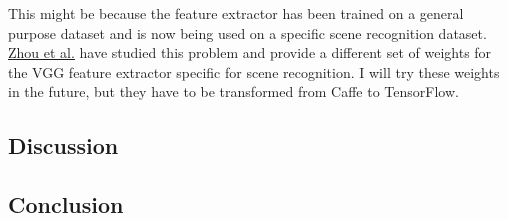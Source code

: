 \documentclass[11pt]{article}
\begin{document}
This might be because the feature extractor has been trained on a general purpose dataset and is now being used on a specific scene recognition dataset.
\href{related\_work/Zhou\%20et\%20al\_2014\_Learning\%20Deep\%20Features\%20for\%20Scene\%20Recognition\%20using\%20Places\%20Database.pdf}{Zhou et al.} have studied this problem and provide a different set of weights for the VGG feature extractor specific for scene recognition.
I will try these weights in the future, but they have to be transformed from Caffe to TensorFlow.

\subsection{Discussion}
\label{sec:org9687719}
\label{orga541d40}

\subsection{Conclusion}
\label{sec:orga976205}
\label{org62c5e91}
\end{document}
